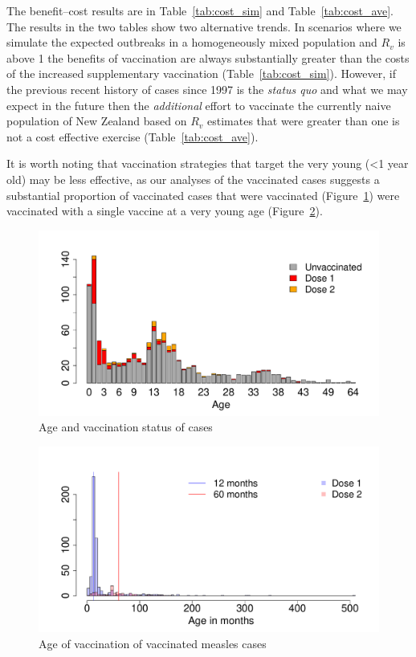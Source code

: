 \documentclass{article}
\begin{document}
The benefit--cost results are in Table~\ref{tab:cost_sim} and Table~\ref{tab:cost_ave}. The results in the two tables show two alternative trends. In scenarios where we simulate the expected outbreaks in a homogeneously mixed population and $R_v$ is above 1 the benefits of vaccination are always substantially greater than the costs of the increased supplementary vaccination (Table~\ref{tab:cost_sim}). However, if the previous recent history of cases since 1997 is the \emph{status quo} and what we may expect in the future then the \emph{additional} effort to vaccinate the currently naive population of New Zealand based on $R_v$ estimates that were greater than one is not a cost effective exercise (Table~\ref{tab:cost_ave}).

It is worth noting that vaccination strategies that target the very young (<1 year old) may be less effective, as our analyses of the vaccinated cases suggests a substantial proportion of vaccinated cases that were vaccinated (Figure~\ref{fig:ageandvac}) were vaccinated with a single vaccine at a very young age (Figure~\ref{fig:vaccstat}).

\begin{figure}[h!]
\begin{center}
\includegraphics{interimreport2-039}
\end{center}
\caption{Age and vaccination status of cases}
\label{fig:ageandvac}
\end{figure}

\begin{figure}[h!]
\begin{center}
\includegraphics{interimreport2-040}
\end{center}
\caption{Age of vaccination of vaccinated measles cases}
\label{fig:vaccstat}
\end{figure}
\end{document}
